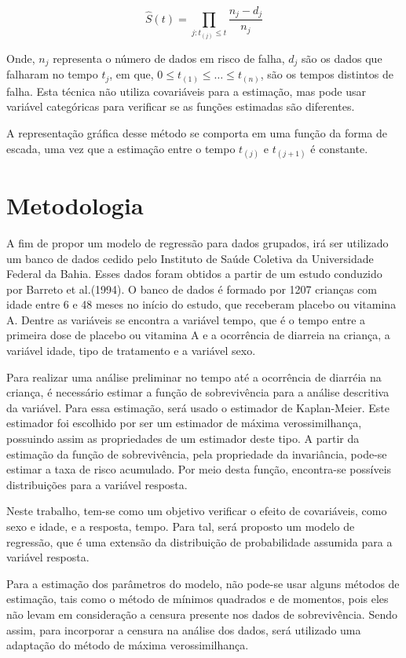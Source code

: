 $$ \hat{S}(t) = \prod_{j:t_{(j)}\le t} \dfrac{n_j - d_j}{n_j}$$

Onde, $n_j$ representa o número de dados em risco de falha, $d_j$ são os dados que falharam no tempo $t_j$, em que, $0 \le t_{(1)} \le \hdots \le t_{(n)}$, são os tempos distintos de falha. Esta técnica não utiliza covariáveis para a estimação, mas pode usar variável categóricas para verificar se as funções estimadas são diferentes. 

A representação gráfica desse método se comporta em uma função da forma de escada, uma vez que a estimação entre o tempo $t_{(j)}$ e $t_{(j+1)}$ é constante.


\section*{Metodologia}

A fim de propor um modelo de regressão para dados grupados, irá ser utilizado um banco de dados cedido pelo Instituto de Saúde Coletiva da Universidade Federal da Bahia. Esses dados foram obtidos a partir de um estudo conduzido por Barreto et al.(1994). O banco de dados é formado por 1207 crianças com idade entre 6 e 48 meses no início do estudo, que receberam placebo ou vitamina A. Dentre as variáveis se encontra a variável tempo, que é o tempo entre a primeira dose de placebo ou vitamina A e a ocorrência de diarreia na criança, a variável idade, tipo de tratamento e a variável sexo.

Para realizar uma análise preliminar no tempo até a ocorrência de diarréia na criança, é necessário estimar a função de sobrevivência para a análise descritiva da variável. Para essa estimação, será usado o estimador de Kaplan-Meier. Este estimador foi escolhido por ser um estimador de máxima verossimilhança, possuindo assim as propriedades de um estimador deste tipo. A partir da estimação da função de sobrevivência, pela propriedade da invariância, pode-se estimar a taxa de risco acumulado. Por meio desta função, encontra-se possíveis distribuições para a variável resposta.

Neste trabalho, tem-se como um objetivo verificar o efeito de covariáveis, como sexo e idade, e a resposta, tempo. Para tal, será proposto um modelo de regressão, que é uma extensão da distribuição de probabilidade assumida para a variável resposta.

Para a estimação dos parâmetros do modelo, não pode-se usar alguns métodos de estimação, tais como o método de mínimos quadrados e de momentos, pois eles não levam em consideração a censura presente nos dados de sobrevivência. Sendo assim, para incorporar a censura na análise dos dados, será utilizado uma adaptação do método de máxima verossimilhança.

